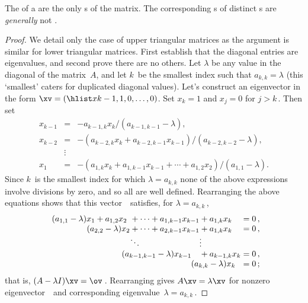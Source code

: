 \begin{theorem} \label{thm:trieig} 
The  of a  are the only s of the matrix.  
The corresponding s of distinct s are \emph{generally} not .
\end{theorem}

\begin{proof} 
We detail only the case of upper triangular matrices as the argument is similar for lower triangular matrices. 
First establish that the diagonal entries are eigenvalues, and second prove there are no others.
Let \(\lambda\) be any value in the diagonal of the matrix~\(A\), and let \(k\)~be the smallest index such that \(a_{k,k}=\lambda\) (this `smallest' caters for duplicated diagonal values).
Let's construct an eigenvector in the form \(\xv=(\hlist x{k-1},1,0,\ldots,0)\).  
Set \(x_k=1\) and \(x_j=0\) for \(j>k\)\,.
Then set 
\begin{eqnarray*}
x_{k-1}&=&-a_{k-1,k}x_k/(a_{k-1,k-1}-\lambda),
\\x_{k-2}&=&-(a_{k-2,k}x_k+a_{k-2,k-1}x_{k-1})/(a_{k-2,k-2}-\lambda),
\\&\vdots&
\\x_1&=&-(a_{1,k}x_k+a_{1,k-1}x_{k-1}+\cdots+a_{1,2}x_2)/(a_{1,1}-\lambda).
\end{eqnarray*}
Since \(k\)~is the smallest index for which \(\lambda=a_{k,k}\) none of the above expressions involve divisions by zero, and so all are well defined.
Rearranging the above equations shows that this vector~\xv\ satisfies, for  \(\lambda=a_{k,k}\)\,,
\begin{equation*}
\begin{array}{l@{}l@{}l@{}l@{}l@{}l}
(a_{1,1}-\lambda)x_1
&{}+a_{1,2}x_2
&{}+\cdots+a_{1,k-1}x_{k-1}
&{}+a_{1,k}x_k
&{}=0\,,
\\&\hspace{-1em}
(a_{2,2}-\lambda)x_2
&{}+\cdots+a_{2,k-1}x_{k-1}
&{}+a_{1,k}x_k
&{}=0\,,
\\&&\ddots&\vdots
\\&&\hspace{-1em}
(a_{k-1,k-1}-\lambda)x_{k-1}
&{}+a_{k-1,k}x_k
&{}=0\,,
\\&&&\hspace{-1em}
(a_{k,k}-\lambda)x_k
&{}=0\,;
\end{array}
\end{equation*}
that is, \((A-\lambda I)\xv=\ov\)\,.
Rearranging gives \(A\xv=\lambda\xv\) for nonzero eigenvector~\xv\ and corresponding eigenvalue~\(\lambda=a_{k,k}\)\,.


\end{proof}
